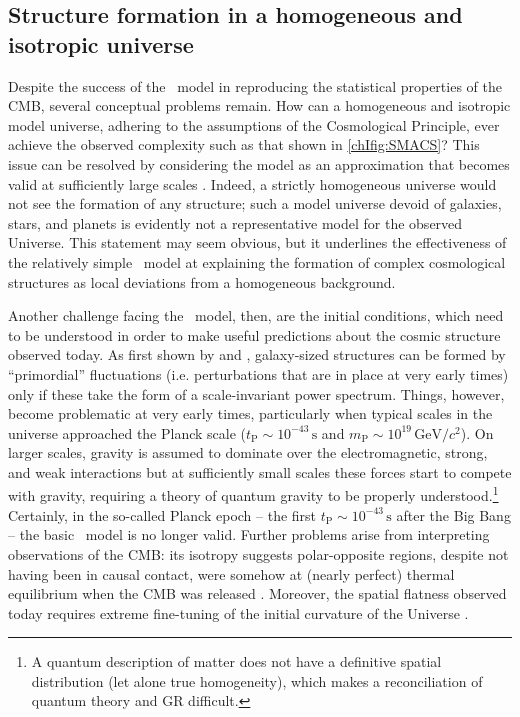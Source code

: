 \subsection{Structure formation in a homogeneous and isotropic universe}
\label{chIssec:Structure_formation_in_a_homogeneous_and_isotropic_universe}

Despite the success of the \LCDM\ model in reproducing the statistical properties of the CMB, several conceptual problems remain. How can a homogeneous and isotropic model universe, adhering to the assumptions of the Cosmological Principle, ever achieve the observed complexity such as that shown in \cref{chIfig:SMACS}? This issue can be resolved by considering the model as an approximation that becomes valid at sufficiently large scales \citep[$l \gtrsim 200 \, \mathrm{cMpc}$ according to simulations, where $\mathrm{cMpc}$ denotes a comoving megaparsec; e.g.][]{2010MNRAS.405.2009Y}. Indeed, a strictly homogeneous universe would not see the formation of any structure; such a model universe devoid of galaxies, stars, and planets is evidently not a representative model for the observed Universe. This statement may seem obvious, but it underlines the effectiveness of the relatively simple \LCDM\ model at explaining the formation of complex cosmological structures as local deviations from a homogeneous background.

Another challenge facing the \LCDM\ model, then, are the initial conditions, which need to be understood in order to make useful predictions about the cosmic structure observed today. As first shown by \citet{1970PhRvD...1.2726H} and \citet{1972MNRAS.160P...1Z}, galaxy-sized structures can be formed by ``primordial'' fluctuations (i.e. perturbations that are in place at very early times) only if these take the form of a scale-invariant power spectrum. Things, however, become problematic at very early times, particularly when typical scales in the universe approached the Planck scale ($t_\text{P} \sim 10^{-43} \, \mathrm{s}$ and $m_\text{P} \sim 10^{19} \, \mathrm{GeV}/c^2$). On larger scales, gravity is assumed to dominate over the electromagnetic, strong, and weak interactions but at sufficiently small scales these forces start to compete with gravity, requiring a theory of quantum gravity to be properly understood.\footnote{A quantum description of matter does not have a definitive spatial distribution (let alone true homogeneity), which makes a reconciliation of quantum theory and GR difficult.} Certainly, in the so-called Planck epoch -- the first $t_\text{P} \sim 10^{-43} \, \mathrm{s}$ after the Big Bang -- the basic \LCDM\ model is no longer valid. Further problems arise from interpreting observations of the CMB: its isotropy suggests polar-opposite regions, despite not having been in causal contact, were somehow at (nearly perfect) thermal equilibrium when the CMB was released \citep[the ``horizon problem'';][]{1968ApJ...151..431M}. Moreover, the spatial flatness observed today requires extreme fine-tuning of the initial curvature of the Universe \citep[the ``flatness problem'';][]{1979grec.conf..504D}.

